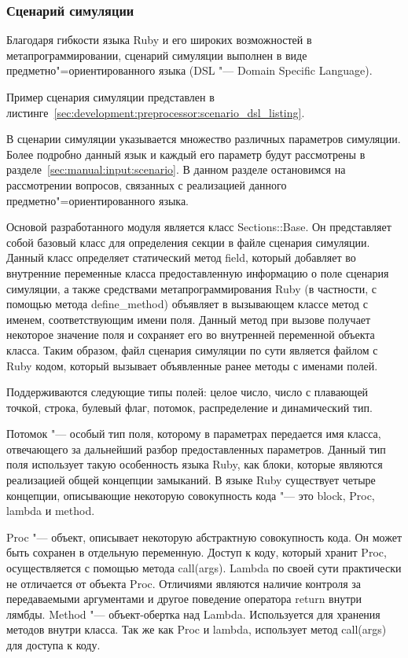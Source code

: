 \subsubsection{Сценарий симуляции}
\label{sec:development:preprocessor:scenario_dsl}

Благодаря гибкости языка Ruby и его широких возможностей в метапрограммировании,
сценарий симуляции выполнен в виде предметно"=ориентированного языка (DSL "--- Domain Specific Language).

Пример сценария симуляции представлен в листинге~\ref{sec:development:preprocessor:scenario_dsl_listing}.



В сценарии симуляции указывается множество различных параметров симуляции.
Более подробно данный язык и каждый его параметр будут рассмотрены в разделе~\ref{sec:manual:input:scenario}.
В данном разделе остановимся на рассмотрении вопросов, связанных с реализацией данного предметно"=ориентированного языка.

Основой разработанного модуля является класс Sections::Base. Он представляет собой базовый класс для определения секции в файле сценария симуляции.
Данный класс определяет статический метод field, который добавляет во внутренние переменные класса предоставленную информацию о поле сценария симуляции,
а также средствами метапрограммирования Ruby (в частности, с помощью метода define\_method) объявляет в вызывающем классе метод с именем, соответствующим имени поля.
Данный метод при вызове получает некоторое значение поля и сохраняет его во внутренней переменной объекта класса.
Таким образом, файл сценария симуляции по сути является файлом с Ruby кодом, который вызывает объявленные ранее методы с именами полей.

Поддерживаются следующие типы полей: целое число, число с плавающей точкой, строка, булевый флаг, потомок, распределение и динамический тип.

Потомок "--- особый тип поля, которому в параметрах передается имя класса, отвечающего за дальнейший разбор предоставленных параметров.
Данный тип поля использует такую особенность языка Ruby, как блоки, которые являются реализацией общей концепции замыканий.
В языке Ruby существует четыре концепции, описывающие некоторую совокупность кода "--- это block, Proc, lambda и method.

Proc "--- объект, описывает некоторую абстрактную совокупность кода. Он может быть сохранен в отдельную переменную. Доступ к коду, который хранит Proc, осуществляется с помощью метода call(args).
Lambda по своей сути практически не отличается от объекта Proc. Отличиями являются наличие контроля за передаваемыми аргументами и другое поведение оператора return внутри лямбды.
Method "--- объект-обертка над Lambda. Используется для хранения методов внутри класса. Так же как Proc и lambda, использует метод call(args) для доступа к коду.

